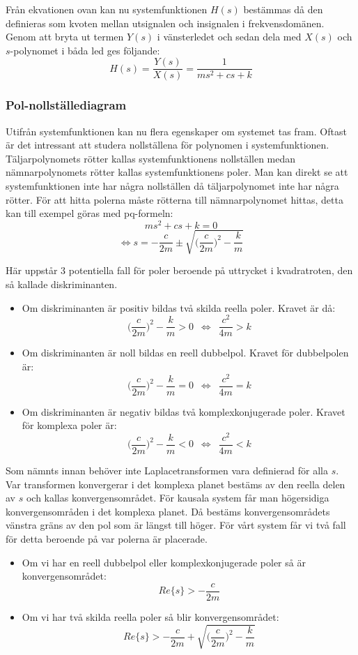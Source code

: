 Från ekvationen ovan kan nu systemfunktionen $H(s)$ bestämmas då den definieras som kvoten mellan utsignalen och insignalen i frekvensdomänen. Genom att bryta ut termen $Y(s)$ i vänsterledet och sedan dela med $X(s)$ och $s$-polynomet i båda led ges följande: 
$$H(s)=\frac{Y(s)}{X(s)}=\frac{1}{ms^2+cs+k}$$
\newline

\subsubsection{Pol-nollställediagram}
Utifrån systemfunktionen kan nu flera egenskaper om systemet tas fram. Oftast är det intressant att studera nollställena för polynomen i systemfunktionen. Täljarpolynomets rötter kallas systemfunktionens nollställen medan nämnarpolynomets rötter kallas systemfunktionens poler. Man kan direkt se att systemfunktionen inte har några nollställen då täljarpolynomet inte har några rötter. För att hitta polerna måste rötterna till nämnarpolynomet hittas, detta kan till exempel göras med pq-formeln:
$$ms^2+cs+k=0$$
$$\Longleftrightarrow s=-\frac{c}{2m}\pm \sqrt{\bigg(\frac{c}{2m}\bigg)^2-\frac{k}{m}}$$

Här uppstår 3 potentiella fall för poler beroende på uttrycket i kvadratroten, den så kallade diskriminanten.

\begin{itemize}
    \item Om diskriminanten är positiv bildas två skilda reella poler. Kravet är då: 
    $$ \bigg(\frac{c}{2m}\bigg)^2-\frac{k}{m} > 0 \,\,\, \Longleftrightarrow\,\,\, \frac{c^2}{4m} > k $$   
    \item Om diskriminanten är noll bildas en reell dubbelpol. Kravet för dubbelpolen är: 
    $$ \bigg(\frac{c}{2m}\bigg)^2-\frac{k}{m} = 0 \,\,\, \Longleftrightarrow\,\,\, \frac{c^2}{4m} = k $$
    \item Om diskriminanten är negativ bildas två komplexkonjugerade poler. Kravet för komplexa poler är: 
    $$ \bigg(\frac{c}{2m}\bigg)^2-\frac{k}{m} < 0 \,\,\, \Longleftrightarrow\,\,\, \frac{c^2}{4m} < k $$
\end{itemize}

Som nämnts innan behöver inte Laplacetransformen vara definierad för alla $s$. Var transformen konvergerar i det komplexa planet bestäms av den reella delen av $s$ och kallas konvergensområdet. För kausala system får man högersidiga konvergensområden i det komplexa planet. Då bestäms konvergensområdets vänstra gräns av den pol som är längst till höger. För vårt system får vi två fall för detta beroende på var polerna är placerade.
\begin{itemize}
    \item Om vi har en reell dubbelpol eller komplexkonjugerade poler så är konvergensområdet:
    $$ Re\{s\} > -\frac{c}{2m} $$
    \item Om vi har två skilda reella poler så blir konvergensområdet:
    $$ Re\{s\} > -\frac{c}{2m}+\sqrt{\bigg(\frac{c}{2m}\bigg)^2-\frac{k}{m}} $$
\end{itemize}

